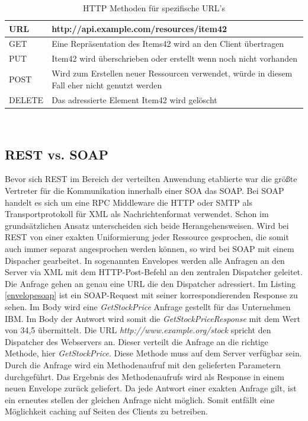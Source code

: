 \documentclass[fleqn,10pt,ngerman]{SelfArx}
\begin{document}
\begin{table}[hbt]
	\caption{HTTP Methoden für spezifische URL's}
	\centering
	\begin{tabular}{ |p{2cm}|p{6cm}|}
		\toprule
		\cmidrule(r){1-2}
		URL & \textbf{http://api.example.com/resources/item42}\\
		\midrule
		GET & Eine Repräsentation des Items42 wird an den Client übertragen\\
		\midrule
		PUT & Item42 wird überschrieben oder erstellt wenn noch nicht vorhanden\\
		\midrule
		POST & Wird zum Erstellen neuer Ressourcen verwendet, würde in diesem Fall eher nicht genutzt werden\\
		\midrule
		DELETE & Das adressierte Element Item42 wird gelöscht\\
		\bottomrule
	\end{tabular}\\
	\label{tab:httptable}
\end{table}

\subsection{REST vs. SOAP}
Bevor sich REST im Bereich der verteilten Anwendung etablierte war die größte Vertreter für die Kommunikation innerhalb einer SOA das SOAP. Bei SOAP handelt es sich um eine RPC Middleware die HTTP oder SMTP als Transportprotokoll für XML als Nachrichtenformat verwendet. Schon im grundsätzlichen Ansatz unterscheiden sich beide Herangehensweisen. Wird bei REST von einer exakten Uniformierung jeder Ressource gesprochen, die somit auch immer separat angesprochen werden können, so wird bei SOAP mit einem Dispacher gearbeitet. In sogenannten Envelopes werden alle Anfragen an den Server via XML mit dem HTTP-Post-Befehl an den zentralen Dispatcher geleitet. Die Anfrage gehen an genau eine URL die den Dispatcher adressiert. Im Listing \ref{envelopesoap} ist ein SOAP-Request mit seiner korrespondierenden Response zu sehen. Im Body wird eine \textit{GetStockPrice} Anfrage gestellt für das Unternehmen IBM. Im Body der Antwort wird somit die \textit{GetStockPriceResponse} mit dem Wert von 34,5 übermittelt. Die URL \textit{http://www.example.org/stock} spricht den Dispatcher des Webservers an. Dieser verteilt die Anfrage an die richtige Methode, hier \textit{GetStockPrice}. Diese Methode muss auf dem Server verfügbar sein. Durch die Anfrage wird ein Methodenaufruf mit den gelieferten Parametern durchgeführt. Das Ergebnis des Methodenaufrufs wird als Response in einem neuen Envelope zurück geliefert. Da jede Antwort einer exakten Anfrage gilt, ist ein erneutes stellen der gleichen Anfrage nicht möglich. Somit entfällt eine Möglichkeit caching auf Seiten des Clients zu betreiben.
\end{document}
